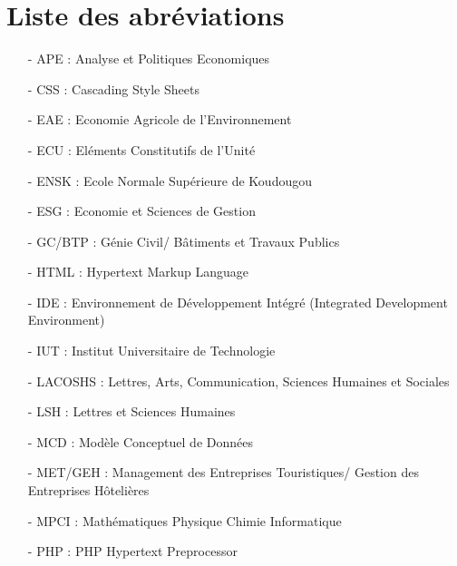 \chapter*{Liste des abréviations}


\begin{itemize}
    \item[-]{
       APE : Analyse et Politiques Economiques
    }
   
   
    \item[-]{
        CSS : Cascading Style Sheets
    }
   
    \item[-]{
        EAE : Economie Agricole de l'Environnement
    }
    \item[-]{
        ECU : Eléments Constitutifs de l'Unité
    }
   
    \item[-]{
        ENSK : Ecole Normale Supérieure de Koudougou
    }
    \item[-]{
        ESG : Economie et Sciences de Gestion
    }
   
    \item[-]{
        GC/BTP : Génie Civil/ B\^atiments et Travaux Publics
    }
    \item[-]{
        HTML : Hypertext Markup Language
    }
    \item[-]{
        IDE : Environnement de Développement Intégré (Integrated Development Environment)
    }
    \item[-]{
        IUT : Institut Universitaire de Technologie
    }
    \item[-]{
        LACOSHS : Lettres, Arts, Communication, Sciences Humaines et Sociales
    }
    \item[-]{
        LSH : Lettres et Sciences Humaines
    }
    \item[-]{
        MCD : Modèle Conceptuel de Données
    }
    \item[-]{
        MET/GEH : Management des Entreprises Touristiques/ Gestion des Entreprises H\^otelières
    }
  
    \item[-]{
        MPCI : Mathématiques Physique Chimie Informatique
    }
    \item[-]{
        PHP : PHP Hypertext Preprocessor
    }
   

\end{itemize}
